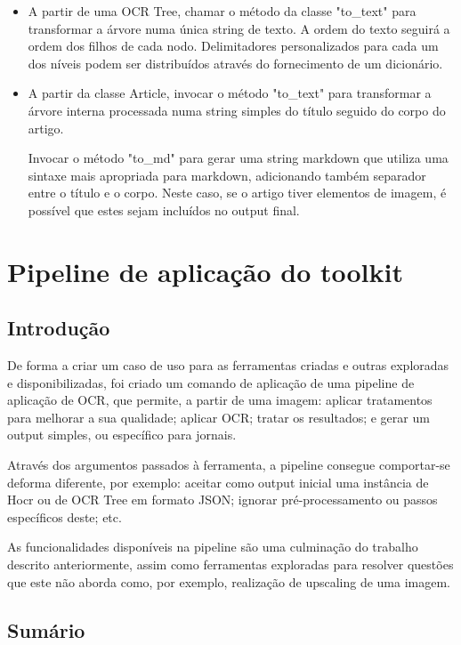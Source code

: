 \begin{itemize}\setlength\itemsep{-0.3em}
	\item A partir de uma OCR Tree, chamar o método da classe "to\_text" para transformar a árvore numa única string de texto. A ordem do texto seguirá a ordem dos filhos de cada nodo. Delimitadores personalizados para cada um dos níveis podem ser distribuídos através do fornecimento de um dicionário.
	\item A partir da classe Article, invocar o método "to\_text" para transformar a árvore interna processada numa string simples do título seguido do corpo do artigo. 
	
	Invocar o método "to\_md" para gerar uma string markdown que utiliza uma sintaxe mais apropriada para markdown, adicionando também separador entre o título e o corpo. Neste caso, se o artigo tiver elementos de imagem, é possível que estes sejam incluídos no output final.
\end{itemize}





\section{Pipeline de aplicação do toolkit}
\label{contribution_toolkit_pipeline}


\subsection{Introdução}

De forma a criar um caso de uso para as ferramentas criadas e outras exploradas e disponibilizadas, foi criado um comando de aplicação de uma pipeline de aplicação de OCR, que permite, a partir de uma imagem: aplicar tratamentos para melhorar a sua qualidade; aplicar OCR; tratar os resultados; e gerar um output simples, ou específico para jornais.

Através dos argumentos passados à ferramenta, a pipeline consegue comportar-se deforma diferente, por exemplo: aceitar como output inicial uma instância de Hocr ou de OCR Tree em formato JSON; ignorar pré-processamento ou passos específicos deste; etc.

As funcionalidades disponíveis na pipeline são uma culminação do trabalho descrito anteriormente, assim como ferramentas exploradas para resolver questões que este não aborda como, por exemplo, realização de upscaling de uma imagem.

\subsection{Sumário}

